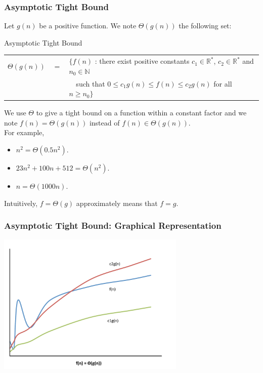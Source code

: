 \documentclass{beamer}
\begin{document}
\begin{frame}%
\frametitle{Asymptotic Tight Bound}

\scriptsize

Let $g(n)$ be a positive function. We note $\Theta(g(n))$ the following set:

\begin{block}{Asymptotic Tight Bound}
\begin{tabular}{lcl}
$\Theta(g(n))$ & $=$ & $\{ f(n)$ : there exist positive constants $c_1 \in \mathbb{R}^*$, $c_2 \in \mathbb{R}^*$ and $n_0 \in \mathbb{N}$\\
& & \ \ such that $0 \le c_1g(n) \le f(n) \le c_2g(n)$ for all $n \ge n_0 \}$\\
\end{tabular}
\end{block}

We use $\Theta$ to give a tight bound on a function within a constant factor and we
note $f(n) = \Theta(g(n))$ instead of $f(n) \in \Theta(g(n))$.\\
\vspace{0.3cm}
For example,
\begin{itemize}
\item $n^2 = \Theta(0.5n^2)$.
\item $23n^2 + 100n + 512 = \Theta(n^2)$.
\item $n = \Theta(1000n)$.
\end{itemize}

\vspace{0.3cm}
Intuitively, $f = \Theta(g)$ approximately means that $f = g$.

\end{frame}

\begin{frame}[containsverbatim]
\frametitle{Asymptotic Tight Bound: Graphical Representation}

\begin{center}
\includegraphics[width=9cm]{big_theta.pdf}%
\end{center}

\end{frame}
\end{document}
